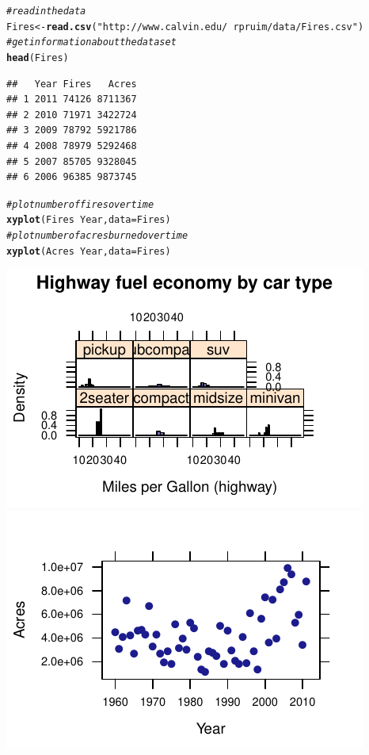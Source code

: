 \documentclass[twoside]{book}\usepackage[]{graphicx}\usepackage[]{xcolor}
\makeatletter
\def\maxwidth{ %
  \ifdim\Gin@nat@width>\linewidth
    \linewidth
  \else
    \Gin@nat@width
  \fi
}
\newcommand{\hlstr}[1]{\textcolor[rgb]{0.192,0.494,0.8}{#1}}%
\newcommand{\hlcom}[1]{\textcolor[rgb]{0.678,0.584,0.686}{\textit{#1}}}%
\newcommand{\hlopt}[1]{\textcolor[rgb]{0,0,0}{#1}}%
\newcommand{\hlstd}[1]{\textcolor[rgb]{0.345,0.345,0.345}{#1}}%
\newcommand{\hlkwb}[1]{\textcolor[rgb]{0.69,0.353,0.396}{#1}}%
\newcommand{\hlkwc}[1]{\textcolor[rgb]{0.333,0.667,0.333}{#1}}%
\newcommand{\hlkwd}[1]{\textcolor[rgb]{0.737,0.353,0.396}{\textbf{#1}}}%
\newenvironment{kframe}{%
 \def\at@end@of@kframe{}%
 \ifinner\ifhmode%
  \def\at@end@of@kframe{\end{minipage}}%
  \begin{minipage}{\columnwidth}%
 \fi\fi%
 \def\FrameCommand##1{\hskip\@totalleftmargin \hskip-\fboxsep
 \colorbox{shadecolor}{##1}\hskip-\fboxsep
     \hskip-\linewidth \hskip-\@totalleftmargin \hskip\columnwidth}%
 \MakeFramed {\advance\hsize-\width
   \@totalleftmargin\z@ \linewidth\hsize
   \@setminipage}}%
 {\par\unskip\endMakeFramed%
 \at@end@of@kframe}
\newenvironment{knitrout}{}{} %
\makeatother
\begin{document}
\begin{solution}

\begin{knitrout}
\color{fgcolor}\begin{kframe}
\begin{alltt}
\hlcom{# read in the data}
\hlstd{Fires} \hlkwb{<-} \hlkwd{read.csv}\hlstd{(}\hlstr{"http://www.calvin.edu/~rpruim/data/Fires.csv"}\hlstd{)}
\hlcom{# get information about the dataset}
\hlkwd{head}\hlstd{(Fires)}
\end{alltt}
\begin{verbatim}
##   Year Fires   Acres
## 1 2011 74126 8711367
## 2 2010 71971 3422724
## 3 2009 78792 5921786
## 4 2008 78979 5292468
## 5 2007 85705 9328045
## 6 2006 96385 9873745
\end{verbatim}
\begin{alltt}
\hlcom{# plot number of fires over time}
\hlkwd{xyplot}\hlstd{(Fires} \hlopt{~} \hlstd{Year,} \hlkwc{data} \hlstd{= Fires)}
\hlcom{# plot number of acres burned over time}
\hlkwd{xyplot}\hlstd{(Acres} \hlopt{~} \hlstd{Year,} \hlkwc{data} \hlstd{= Fires)}
\end{alltt}
\end{kframe}

{\centering \includegraphics[width=\maxwidth]{figures/fig-unnamed-chunk-28-1} 
\includegraphics[width=\maxwidth]{figures/fig-unnamed-chunk-28-2} 

}
\end{knitrout}
\end{solution}
\end{document}
